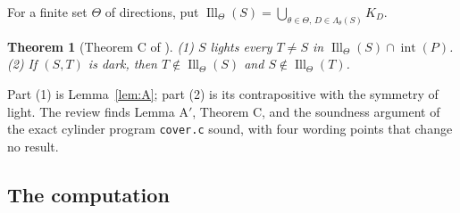 \documentclass[11pt]{article}
\newtheorem{theorem}{Theorem}
\theoremstyle{definition}
\theoremstyle{remark}
\newcommand{\interior}{\operatorname{int}}
\begin{document}
For a finite set $\Theta$ of directions, put
$\operatorname{Ill}_\Theta(S)=\bigcup_{\theta\in\Theta,\,D\in\Lambda_\theta(S)}K_D$.

\begin{theorem}[Theorem C of \cite{d13}]\label{thm:C}
(1) $S$ lights every $T\ne S$ in $\operatorname{Ill}_\Theta(S)\cap\interior(P)$.
(2) If $(S,T)$ is dark, then $T\notin\operatorname{Ill}_\Theta(S)$ and
$S\notin\operatorname{Ill}_\Theta(T)$.
\end{theorem}
Part (1) is Lemma~\ref{lem:A}; part (2) is its contrapositive with the
symmetry of light. The review \cite{d96} finds Lemma A$'$, Theorem C, and
the soundness argument of the exact cylinder program \texttt{cover.c}
sound, with four wording points that change no result.

\subsection{The computation}
\end{document}

